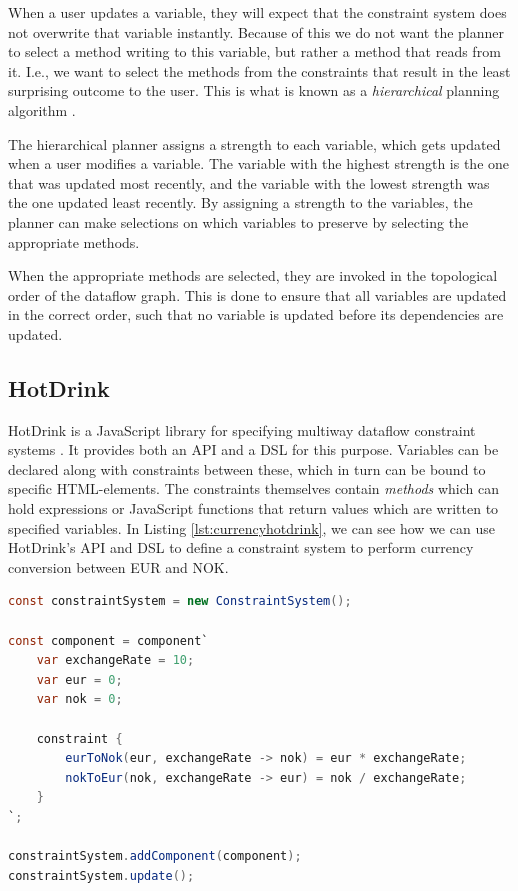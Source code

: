 \documentclass[11pt, a4paper]{article}
\begin{document}
When a user updates a variable, they will expect that the constraint system does not overwrite that variable instantly. Because of this we do not want the planner to select a method writing to this variable, but rather a method that reads from it. I.e., we want to select the methods from the constraints that result in the least surprising outcome to the user. This is what is known as a \textit{hierarchical} planning algorithm \cite{planners}.

The hierarchical planner assigns a strength to each variable, which gets updated when a user modifies a variable. The variable with the highest strength is the one that was updated most recently, and the variable with the lowest strength was the one updated least recently. By assigning a strength to the variables, the planner can make selections on which variables to preserve by selecting the appropriate methods.

When the appropriate methods are selected, they are invoked in the topological order of the dataflow graph. This is done to ensure that all variables are updated in the correct order, such that no variable is updated before its dependencies are updated.

\subsection{HotDrink}
\label{sec:hotdrink}
HotDrink is a JavaScript library for specifying multiway dataflow constraint systems \cite{hotdrink}. It provides both an API and a DSL for this purpose. Variables can be declared along with constraints between these, which in turn can be bound to specific HTML-elements. The constraints themselves contain \textit{methods} which can hold expressions or JavaScript functions that return values which are written to specified variables. In Listing \ref{lst:currencyhotdrink}, we can see how we can use HotDrink's API and DSL to define a constraint system to perform currency conversion between EUR and NOK.

\begin{lstlisting}[language=java, caption={Currency conversion in HotDrink.}, label={lst:currencyhotdrink}]
const constraintSystem = new ConstraintSystem();

const component = component`
    var exchangeRate = 10;
    var eur = 0;
    var nok = 0;

    constraint {
        eurToNok(eur, exchangeRate -> nok) = eur * exchangeRate;
        nokToEur(nok, exchangeRate -> eur) = nok / exchangeRate;
    }
`;

constraintSystem.addComponent(component);
constraintSystem.update();
\end{lstlisting}
\end{document}
